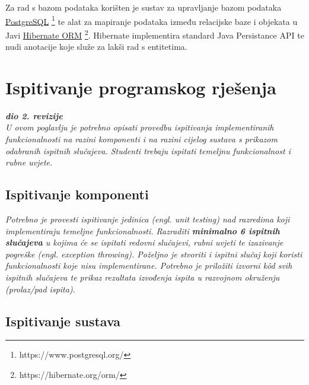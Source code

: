 			 Za rad s bazom podataka korišten je sustav za upravljanje bazom podataka \underline{PostgreSQL} \footnote{https://www.postgresql.org/} te alat za mapiranje podataka između relacijske baze i objekata u Javi \underline{Hibernate ORM} \footnote{https://hibernate.org/orm/}. Hibernate implementira standard Java Persistance API te nudi anotacije koje služe za lakši rad s entitetima.
			
			
			\eject 
		
	
		\section{Ispitivanje programskog rješenja}
			
			\textbf{\textit{dio 2. revizije}}\\
			
			 \textit{U ovom poglavlju je potrebno opisati provedbu ispitivanja implementiranih funkcionalnosti na razini komponenti i na razini cijelog sustava s prikazom odabranih ispitnih slučajeva. Studenti trebaju ispitati temeljnu funkcionalnost i rubne uvjete.}
	
			
			\subsection{Ispitivanje komponenti}
			\textit{Potrebno je provesti ispitivanje jedinica (engl. unit testing) nad razredima koji implementiraju temeljne funkcionalnosti. Razraditi \textbf{minimalno 6 ispitnih slučajeva} u kojima će se ispitati redovni slučajevi, rubni uvjeti te izazivanje pogreške (engl. exception throwing). Poželjno je stvoriti i ispitni slučaj koji koristi funkcionalnosti koje nisu implementirane. Potrebno je priložiti izvorni kôd svih ispitnih slučajeva te prikaz rezultata izvođenja ispita u razvojnom okruženju (prolaz/pad ispita). }
			
			
			
			\subsection{Ispitivanje sustava}
			
